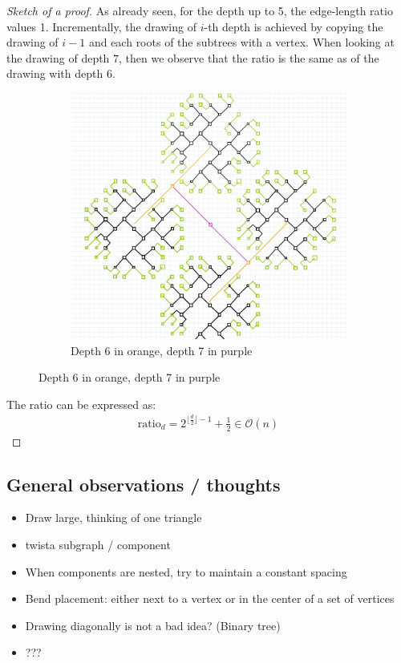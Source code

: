 \begin{proof}[Sketch of a proof]
	As already seen, for the depth up to 5, the edge-length ratio values 1. Incrementally, the drawing of $i$-th depth is achieved by copying the drawing of $i-1$ and each roots of the subtrees with a vertex. When looking at the drawing of depth $7$, then we observe that the ratio is the same as of the drawing with depth 6.
			\begin{figure}[H]
		\centering
		\begin{subfigure}{0.8\textwidth}
			\centering
			\includegraphics[width=\linewidth]{drawings/bintree-with-bends-depth-7.jpg}
			\caption*{Depth 6 in orange, depth 7 in purple}
		\end{subfigure}
	\end{figure}
	The ratio can be expressed as:
	\begin{align*}
		\text{ratio}_d = 2^{\lfloor\frac{d}{2}\rfloor-1} + \frac{1}{2}\in \mathcal{O}(n)
	\end{align*}
\end{proof}
\subsection{General observations / thoughts}
\begin{itemize}
	\item Draw large, thinking of one triangle
	\item \grqq twist\grqq a subgraph / component
	\item When components are nested, try to maintain a constant spacing
	\item Bend placement: either next to a vertex or in the center of a set of vertices
	\item Drawing diagonally is not a bad idea? (Binary tree)
	\item ???
\end{itemize}
